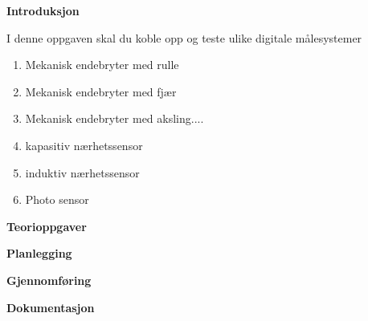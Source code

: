 

\noindent

\vskip 5pt


\textbf{Introduksjon}

I denne oppgaven skal du koble opp og teste ulike digitale målesystemer



\begin{enumerate}
\item Mekanisk endebryter med rulle
\item Mekanisk endebryter med fjær
\item Mekanisk endebryter med aksling....
\item kapasitiv nærhetssensor 
\item induktiv nærhetssensor
\item Photo sensor 
\end{enumerate}


\textbf{Teorioppgaver}

\textbf{Planlegging}

\textbf{Gjennomføring}

\textbf{Dokumentasjon}

















\vfil \eject

















